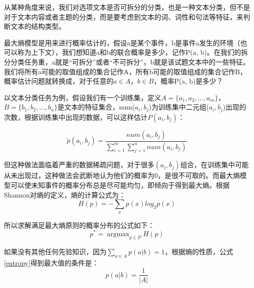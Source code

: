 \documentclass[master, winfont]{njuthesis}
\begin{document}
从某种角度来说，我们对选项文本是否可拆分的分类，也是一种文本分类，但不是对于文本内容或者主题的分类，而是要考虑到文本的词、词性和句法等特征，来判断文本的结构类型。

最大熵模型是用来进行概率估计的，假设a是某个事件，b是事件a发生的环境（也可以称为上下文），我们想知道a和b的联合概率是多少，记作P(a, b)。在我们的拆分分类任务重，a就是“可拆分”或者“不可拆分”，b就是该试题文本中的一些特征。我们将所有a可能的取值组成的集合记作A，所有b可能的取值组成的集合记作B，概率估计问题就转换成，对于任意的$a \in A$，$b \in B$，概率P(a, b)是多少？

以文本分类任务为例，假设我们有一个训练集，定义$A = \{a_1,a_2, ..., a_m\}$，$B = \{b_1, b_2, ..., b_n\}$是文本的特征集合，num($a_i, b_j$)为训练集中二元组($a_i, b_j$)出现的次数，根据训练集中出现的数据，可以这样估计$P(a_i, b_j)$：

\begin{equation}
	\label{probability}
	\tilde{p}(a_i,b_j)=\frac{num(a_i,b_j)}{\sum_{i=1}^m\sum_{j=1}^n num(a_i, b_j)}
\end{equation}

但这种做法面临着严重的数据稀疏问题，对于很多$(a_i, b_j)$组合，在训练集中可能从未出现过，这种做法会武断地认为他们的概率为0，是很不可取的。而最大熵模型可以使未知事件的概率分布总是尽可能均匀，即倾向于得到最大熵。根据Shannon对熵的定义，熵的计算公式为：
\begin{equation}
	\label{entropy}
	H(p) = -\sum_{x} p(x)log_{2}p(x)
\end{equation}

所以求解满足最大熵原则的概率分布的公式如下：
\begin{equation}
	\label{entropy_2}
	p^* = \mathop{\arg\max}_{p∈P}H(p)
\end{equation}

如果没有其他任何先验知识，因为$\sum_{a\in A}p(a|b)=1$，根据熵的性质，公式\ref{entropy}得到最大值的条件是：
\begin{equation}
	\label{max_value}
	p(a | b) = \frac{1}{|A|}
\end{equation}

\end{document}
